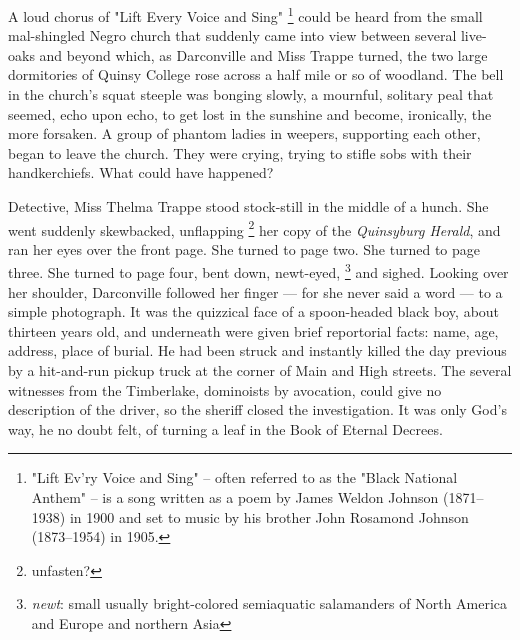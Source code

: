   A loud chorus of "Lift Every Voice and Sing" 
\footnote{
"Lift Ev'ry Voice and Sing" -- often referred to as the "Black National Anthem" 
-- is a song written as a poem by James Weldon Johnson (1871–1938) in 1900 and 
set to music by his brother John Rosamond Johnson (1873–1954) in 1905.
}
could be heard from the small
mal-shingled 
Negro church that suddenly came into view between several live-oaks
and beyond which, as Darconville and Miss Trappe turned, the two large
dormitories of Quinsy College rose across a half mile or so of woodland. The
bell in the church's squat 
steeple was bonging 
slowly, a mournful, solitary peal
that seemed, echo upon echo, to get lost in the sunshine and become, ironically,
the more forsaken. A group of phantom ladies in weepers, 
supporting each other,
began to leave the church. They were crying, trying to stifle sobs with their
handkerchiefs. What could have happened?

  Detective, Miss Thelma Trappe stood stock-still in the middle of a hunch. She
went suddenly skewbacked, unflapping 
\footnote{ \textdbend unfasten?}
her copy of the \textit{Quinsyburg Herald}, and ran
her eyes over the front page. She turned to page two. She turned to page three.
She turned to page four, bent down, newt-eyed, 
\footnote{ \textit{newt}: small usually bright-colored semiaquatic salamanders
  of North America and Europe and northern Asia}
and sighed. Looking over her
shoulder, Darconville followed her finger --- for she never said a word ---
to a simple photograph. It was the quizzical 
face of a spoon-headed black boy, about
thirteen years old, and underneath were given brief reportorial 
facts: name, age, address, place of burial. 
He had been struck and instantly killed the day
previous by a hit-and-run pickup truck at the corner of Main and High streets.
The several witnesses from the Timberlake, dominoists by avocation, could give
no description of the driver, so the sheriff closed the investigation. It was
only God's way, he no doubt felt, of turning a leaf in the Book of Eternal
Decrees.

